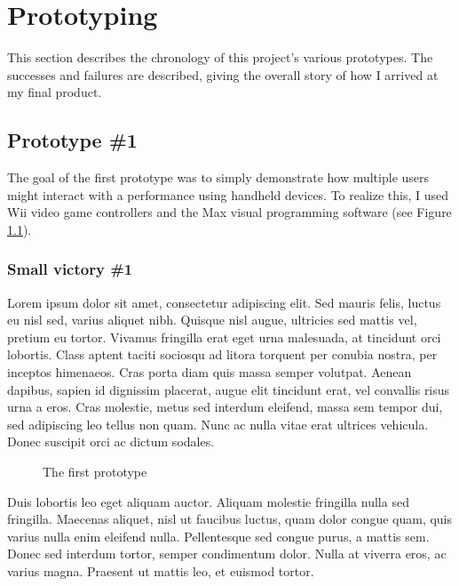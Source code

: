 \chapter{Prototyping}

This section describes the chronology of this project's various prototypes. The successes and failures are described, giving the overall story of how I arrived at my final product.

\section{Prototype \#1}

The goal of the first prototype was to simply demonstrate how multiple users might interact with a performance using handheld devices. To realize this, I used Wii video game controllers and the Max visual programming software (see Figure \ref{proto1}).

\subsection{Small victory \#1}

Lorem ipsum dolor sit amet, consectetur adipiscing elit. Sed mauris felis, luctus eu nisl sed, varius aliquet nibh. Quisque nisl augue, ultricies sed mattis vel, pretium eu tortor. Vivamus fringilla erat eget urna malesuada, at tincidunt orci lobortis. Class aptent taciti sociosqu ad litora torquent per conubia nostra, per inceptos himenaeos. Cras porta diam quis massa semper volutpat. Aenean dapibus, sapien id dignissim placerat, augue elit tincidunt erat, vel convallis risus urna a eros. Cras molestie, metus sed interdum eleifend, massa sem tempor dui, sed adipiscing leo tellus non quam. Nunc ac nulla vitae erat ultrices vehicula. Donec suscipit orci ac dictum sodales.

\begin{figure}[t]
\centering

\hspace{1cm}
\caption{The first prototype}

\label{proto1}
\end{figure}

Duis lobortis leo eget aliquam auctor. Aliquam molestie fringilla nulla sed fringilla. Maecenas aliquet, nisl ut faucibus luctus, quam dolor congue quam, quis varius nulla enim eleifend nulla. Pellentesque sed congue purus, a mattis sem. Donec sed interdum tortor, semper condimentum dolor. Nulla at viverra eros, ac varius magna. Praesent ut mattis leo, et euismod tortor.

